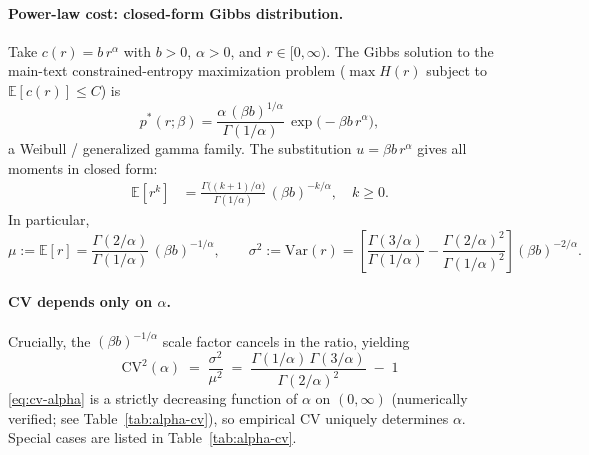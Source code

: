 \documentclass[11pt]{article}
\theoremstyle{remark}
\theoremstyle{definition}
\begin{document}
\paragraph{Power-law cost: closed-form Gibbs distribution.}
Take $c(r) = b\,r^\alpha$ with $b>0$, $\alpha>0$, and $r\in[0,\infty)$.  The Gibbs solution to the main-text constrained-entropy maximization problem ($\max H(r)$ subject to $\mathbb{E}[c(r)]\le C$) is
\begin{equation}
  p^{*}(r;\beta) = \frac{\alpha\,(\beta b)^{1/\alpha}}{\Gamma(1/\alpha)}\,\exp\!\big(-\beta b\,r^{\alpha}\big),
  \label{eq:gibbs-power}
\end{equation}
a Weibull / generalized gamma family.  The substitution $u = \beta b\,r^{\alpha}$ gives all moments in closed form:
\begin{align}
  \mathbb{E}[r^k]
  &= \frac{\Gamma\!\big((k+1)/\alpha\big)}{\Gamma(1/\alpha)}\,(\beta b)^{-k/\alpha}, \quad k\ge 0.
  \label{eq:moments-power}
\end{align}
In particular,
\begin{equation}
  \mu := \mathbb{E}[r] = \frac{\Gamma(2/\alpha)}{\Gamma(1/\alpha)}\,(\beta b)^{-1/\alpha},
  \qquad
  \sigma^2 := \mathrm{Var}(r) = \left[\frac{\Gamma(3/\alpha)}{\Gamma(1/\alpha)} - \frac{\Gamma(2/\alpha)^2}{\Gamma(1/\alpha)^2}\right](\beta b)^{-2/\alpha}.
\end{equation}

\paragraph{CV depends only on $\alpha$.}
Crucially, the $(\beta b)^{-1/\alpha}$ scale factor cancels in the ratio, yielding
\begin{equation}
  \boxed{\;\mathrm{CV}^2(\alpha)\;=\;\frac{\sigma^2}{\mu^2}\;=\;\frac{\Gamma(1/\alpha)\,\Gamma(3/\alpha)}{\Gamma(2/\alpha)^{2}}\;-\;1\;}
  \label{eq:cv-alpha}
\end{equation}
\eqref{eq:cv-alpha} is a strictly decreasing function of $\alpha$ on $(0,\infty)$ (numerically verified; see Table~\ref{tab:alpha-cv}), so empirical CV uniquely determines $\alpha$.  Special cases are listed in Table~\ref{tab:alpha-cv}.
\end{document}
